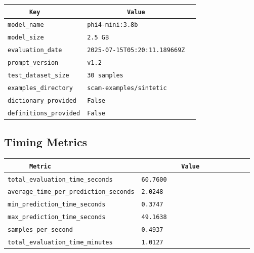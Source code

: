 \documentclass{article}
\begin{document}
\begin{center}
\begin{tabular}{l | l} \hline
    \verb|      Key      | & \verb|           Value           | \\ \hline
    \hline
    \verb|model_name    | & \verb|phi4-mini:3.8b               | \\ \hline
    \verb|model_size    | & \verb|2.5 GB                       | \\ \hline
    \verb|evaluation_date| & \verb|2025-07-15T05:20:11.189669Z  | \\ \hline
    \verb|prompt_version| & \verb|v1.2                         | \\ \hline
    \verb|test_dataset_size| & \verb|30 samples                   | \\ \hline
    \verb|examples_directory| & \verb|scam-examples/sintetic       | \\ \hline
    \verb|dictionary_provided| & \verb|False                        | \\ \hline
    \verb|definitions_provided| & \verb|False                        | \\ \hline
\end{tabular}
\end{center}

\subsection{Timing Metrics}

\begin{center}
\begin{tabular}{l | l} \hline
    \verb|      Metric     | & \verb|           Value           | \\ \hline
    \hline
    \verb|total_evaluation_time_seconds| & \verb|60.7600                      | \\ \hline
    \verb|average_time_per_prediction_seconds| & \verb|2.0248                       | \\ \hline
    \verb|min_prediction_time_seconds| & \verb|0.3747                       | \\ \hline
    \verb|max_prediction_time_seconds| & \verb|49.1638                      | \\ \hline
    \verb|samples_per_second| & \verb|0.4937                       | \\ \hline
    \verb|total_evaluation_time_minutes| & \verb|1.0127                       | \\ \hline
\end{tabular}
\end{center}
\end{document}

